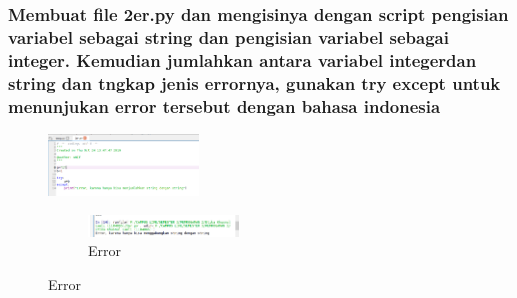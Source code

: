 \subsubsection{Membuat file 2er.py dan mengisinya dengan script pengisian variabel sebagai string dan pengisian variabel sebagai integer. Kemudian jumlahkan antara variabel integerdan string dan tngkap jenis errornya, gunakan try except untuk menunjukan error tersebut dengan bahasa indonesia}
\begin{figure}[H]
		\includegraphics[width=4cm]{figures/1184065/2er.PNG}
		\centering
		\caption{Kodingan Variabel sebagai string dan variabel sebagai integer }
		\begin{figure}[H]
		\includegraphics[width=4cm]{figures/1184065/2erError.PNG}
		\centering
		\caption{Error}
\end{figure}
\end{figure}
